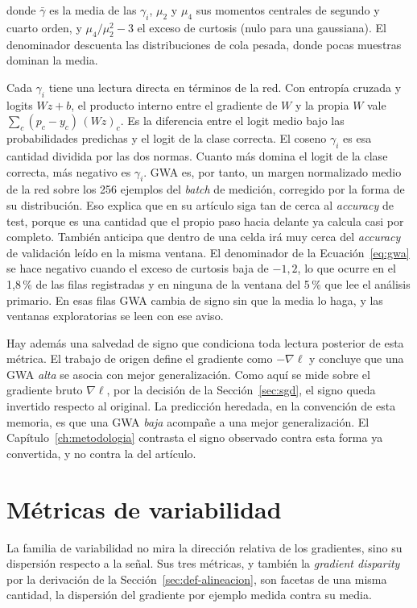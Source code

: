 donde $\bar{\gamma}$ es la media de las $\gamma_i$, $\mu_2$ y $\mu_4$ sus momentos centrales de segundo y cuarto orden, y $\mu_4/\mu_2^2 - 3$ el exceso de curtosis (nulo para una gaussiana). El denominador descuenta las distribuciones de cola pesada, donde pocas muestras dominan la media.

Cada $\gamma_i$ tiene una lectura directa en términos de la red. Con entropía cruzada y logits $Wz + b$, el producto interno entre el gradiente de $W$ y la propia $W$ vale $\sum_c (p_c - y_c)\,(Wz)_c$. Es la diferencia entre el logit medio bajo las probabilidades predichas y el logit de la clase correcta. El coseno $\gamma_i$ es esa cantidad dividida por las dos normas. Cuanto más domina el logit de la clase correcta, más negativo es $\gamma_i$. GWA es, por tanto, un margen normalizado medio de la red sobre los 256 ejemplos del \emph{batch} de medición, corregido por la forma de su distribución. Eso explica que en su artículo siga tan de cerca al \emph{accuracy} de test, porque es una cantidad que el propio paso hacia delante ya calcula casi por completo. También anticipa que dentro de una celda irá muy cerca del \emph{accuracy} de validación leído en la misma ventana. El denominador de la Ecuación~\ref{eq:gwa} se hace negativo cuando el exceso de curtosis baja de $-1{,}2$, lo que ocurre en el 1,8\,\% de las filas registradas y en ninguna de la ventana del 5\,\% que lee el análisis primario. En esas filas GWA cambia de signo sin que la media lo haga, y las ventanas exploratorias se leen con ese aviso.

Hay además una salvedad de signo que condiciona toda lectura posterior de esta métrica. El trabajo de origen define el gradiente como $-\nabla\ell$ y concluye que una GWA \emph{alta} se asocia con mejor generalización. Como aquí se mide sobre el gradiente bruto $\nabla\ell$, por la decisión de la Sección~\ref{sec:sgd}, el signo queda invertido respecto al original. La predicción heredada, en la convención de esta memoria, es que una GWA \emph{baja} acompañe a una mejor generalización. El Capítulo~\ref{ch:metodologia} contrasta el signo observado contra esta forma ya convertida, y no contra la del artículo.

\section{Métricas de variabilidad}
\label{sec:def-variabilidad}

La familia de variabilidad no mira la dirección relativa de los gradientes, sino su dispersión respecto a la señal. Sus tres métricas, y también la \emph{gradient disparity} por la derivación de la Sección~\ref{sec:def-alineacion}, son facetas de una misma cantidad, la dispersión del gradiente por ejemplo medida contra su media.

